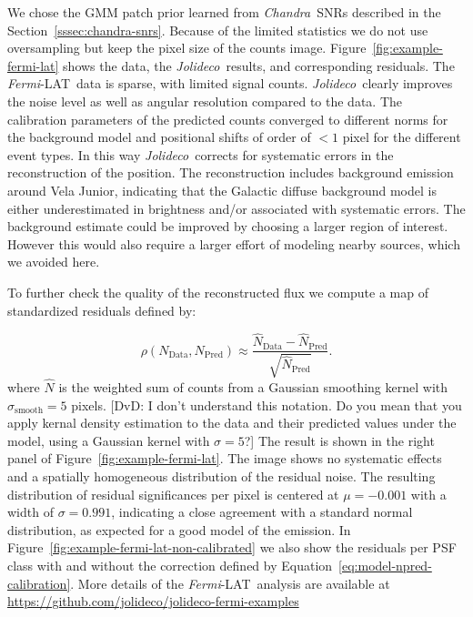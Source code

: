 \documentclass[twocolumn]{aastex631}
\newcommand{\chandra}{\textit{Chandra}~}
\newcommand{\fermi}{\textit{Fermi}-LAT~}
\newcommand{\jolideco}{\textit{Jolideco}~}
\newcommand{\dvd}[1]{{\color{red} [DvD: #1]}}
\begin{document}
    We chose the GMM patch prior learned from \chandra SNRs described in the Section~\ref{sssec:chandra-snrs}. Because of the limited statistics we do not use oversampling but keep the pixel size of the counts image. Figure~\ref{fig:example-fermi-lat} shows the data,  the \jolideco results, and corresponding residuals. The \fermi data is sparse, with limited signal counts. \jolideco clearly improves the noise level as well as angular resolution compared to the data. The calibration parameters of the predicted counts converged to different norms for the background model and positional shifts of order of $<1$ pixel for the different event types. In this way \jolideco corrects for systematic errors in the reconstruction of the position. The reconstruction includes background emission around Vela Junior, indicating that the Galactic diffuse background model is either underestimated in brightness and/or associated with systematic errors. The background estimate could be improved by choosing a larger region of interest. However this would also require a larger effort of modeling nearby sources, which we avoided here.
    
    To further check the quality of the reconstructed flux we compute a map of standardized residuals defined by:

    \begin{equation}
        \label{eq:approx-sigma}
        \rho(N_{\mathrm{Data}}, N_{\mathrm{Pred}}) \approx \frac{\hat{N}_{\mathrm{Data}} - \hat{N}_{\mathrm{Pred}}} {\sqrt{\hat{N}_{\mathrm{Pred}}}}.
    \end{equation}
where $\hat{N}$ is the weighted sum of counts from a Gaussian smoothing kernel with $\sigma_{\mathrm{smooth}}=5$ pixels. \dvd{I don't understand this notation. Do you mean that you apply kernal density estimation to the data and their predicted values under the model, using a Gaussian kernel with $\sigma=5$?}  The result is shown in the right panel of Figure~\ref{fig:example-fermi-lat}. The image shows no systematic effects and a spatially homogeneous distribution of the residual noise. The resulting distribution of residual significances per pixel is centered at $\mu=-0.001$ with a width of $\sigma=0.991$, indicating a close agreement with a standard normal distribution, as expected for a good model of the emission. In Figure~\ref{fig:example-fermi-lat-non-calibrated} we also show the residuals per PSF class with and without the correction defined by Equation~\ref{eq:model-npred-calibration}. More details of the \fermi analysis are available at \url{https://github.com/jolideco/jolideco-fermi-examples}
    
\end{document}
